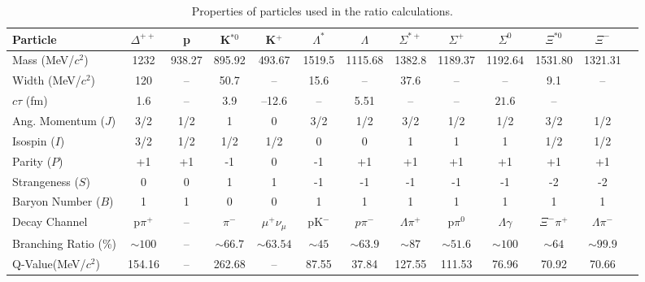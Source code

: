 \hspace*{-1cm}
 \begin{table}

\hspace*{-1cm}
\caption{\label{opt} Properties of particles used in the ratio calculations.}
%
\hspace*{-1cm}
%
 \begin{tabular}{lcccccccccccc}

\hline
\hline
Particle&$\Delta^{++}$ &  p & K$^{*0}$  &K$^{+} $ & $\Lambda^{*}$ & $\Lambda$& $\Sigma^{*+}$  & $\Sigma^{+}$ & $\Sigma^{0}$ & $\Xi^{*0}$ & $\Xi^{-}$\\
\hline
Mass (MeV/$c^{2}$)&1232&938.27&895.92&493.67&1519.5&1115.68&1382.8&1189.37&1192.64&1531.80&1321.31\\
Width (MeV/$c^{2}$)&120&--&50.7&--&15.6&--&37.6&--&--&9.1&--\\
$c\tau$ (fm)&1.6&--&3.9&--12.6&--&5.51&--&--&$21.6$&--\\
Ang. Momentum ($J$)&3/2&1/2&1&0&3/2&1/2&3/2&1/2&1/2&3/2&1/2\\
Isospin ($I$)&3/2&1/2&1/2&1/2&0&0&1&1&1&1/2&1/2\\
Parity ($P$)&+1&+1&-1&0&-1&+1&+1&+1&+1&+1&+1\\
Strangeness ($S$)&0&0&1&1&-1&-1&-1&-1&-1&-2&-2\\
Baryon Number ($B$)&1&1&0&0&1&1&1&1&1&1&1\\
Decay Channel&p$\pi^{+}$&--&$\pi^{-}$&$\mu^{+}\nu_{\mu}$&pK$^{-}$&$p\pi^{-}$&$\Lambda\pi^{+}$&p$\pi^{0}$&$\Lambda\gamma$&$\Xi^{-}\pi^{+}$&$\Lambda\pi^{-}$\\
Branching Ratio (\%)&$\sim100$&--&$\sim66.7$&$\sim63.54$&$\sim45$&$\sim63.9$&$\sim87$&$\sim51.6$&$\sim100$&$\sim64$&$\sim99.9$\\
Q-Value(MeV/$c^{2}$)&154.16&--&262.68&--&87.55&37.84&127.55&111.53&76.96&70.92&70.66\\
 \hline
 \hline
\end{tabular}
\end{table}


